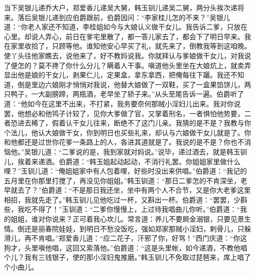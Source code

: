 当下吴银儿递乔大户，郑爱香儿递吴大舅，韩玉钏儿递吴二舅，两分头挨次递将来。落后吴银儿递到应伯爵跟前，伯爵因问：“李家桂儿怎的不来？”吴银儿道：“你老人家还不知道，李桂姐如今与大娘认义做干女儿。我告诉二爹，只放在心里。却说人弄心，前日在爹宅里散了，都一答儿家去了，都会下了明日早来。我在家里收拾了，只顾等他。谁知他安心早买了礼，就先来了，倒教我等到这咱晚。使丫头往他家瞧去，说他来了，好不教妈说我。你就拜认与爹娘做干女儿，对我说了便怎的？莫不搀了你什么分儿？瞒着人干事。嗔道他头里坐在大娘炕上，就卖弄显出他是娘的干女儿，剥果仁儿，定果盒，拿东拿西，把俺每往下躧。我还不知道，倒是里边六娘刚才悄悄对我说，他替大娘做了一双鞋，买了一盒果馅饼儿，两只鸭子，一大副膀蹄，两瓶酒，老早坐了轿子来。”从头至尾告诉一遍。伯爵听了道：“他如今在这里不出来，不打紧，我务要奈何那贼小淫妇儿出来。我对你说罢，他想必和他鸨子计较了，见你大爹做了官，又掌着刑名，一者惧怕他势要，二者恐进去稀了，假着认干女儿往来，断绝不了这门儿亲。我猜的是不是？我教与你个法儿，他认大娘做干女，你到明日也买些礼来，却认与六娘做干女儿就是了。你和他都还是过世你花爹一条路上的人，各进其道就是了。我说的是不是？你也不消恼他。”吴银儿道：“二爹说的是，我到家就对妈说。”说毕，递过酒去，就是韩玉钏儿，挨着来递酒。伯爵道：“韩玉姐起动起动，不消行礼罢。你姐姐家里做什么哩？”玉钏儿道：“俺姐姐家中有人包着哩，好些时没出来供唱。”伯爵道：“我记的五月里在你那里打搅了，再没见你姐姐。”韩玉钏道：“那日二爹怎的不肯深坐，老早就去了？”伯爵道：“不是那日我还坐，坐中有两个人不合节，又是你大老爹这里相招，我就先走了。”韩玉钏儿见他吃过一杯，又斟出一杯。伯爵道：“罢罢，少斟些，我吃不得了！”玉钏道：“二爹你慢慢上，上过待我唱曲儿你听。”伯爵道：“我的姐姐，谁对你说来？正可着我心坎儿。常言道：养儿不要屙金溺银，只要见景生情。倒还是丽春院娃娃，到明日不愁没饭吃，强如郑家那贼小淫妇，剌骨儿，只躲滑儿，再不肯唱。”郑爱香儿道：“应二花子，汗邪了你，好骂！”西门庆道：“你这狗才，头里嗔他唱，这回又索落他。”伯爵道：“这是头里帐，如今递酒，不教他唱个儿？我有三钱银子，使的那小淫妇鬼推磨。”韩玉钏儿不免取过琵琶来，席上唱了个小曲儿。

